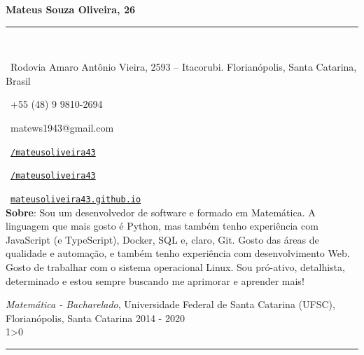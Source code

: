 \documentclass[a4paper,10pt]{article}
\makeatletter
\newcommand{\profissional}{Mateus Souza Oliveira}
\newcommand{\idade}{26}
\newcommand{\Endereco}{Rodovia Amaro Antônio Vieira, 2593 -- Itacorubi. Florianópolis, Santa Catarina, Brasil}
\newcommand{\telefone}{+55 (48) 9 9810-2694}
\newcommand{\email}{matews1943@gmail.com}
\newcommand{\sobre}{
    Sou um desenvolvedor de software e formado em Matemática. A linguagem que mais gosto é 
    Python, mas também tenho experiência com JavaScript (e TypeScript), Docker, SQL e, claro,
    Git. Gosto das áreas de qualidade e automação, e também tenho experiência com desenvolvimento 
    Web. Gosto de trabalhar com o sistema operacional Linux. Sou pró-ativo, detalhista, determinado 
    e estou sempre buscando me aprimorar e aprender mais!
    \vspace{2\baselineskip}
}
\newcommand{\criaSecao}[4][0]{
	\begin{tcolorbox}[
        blanker,
        breakable,
        title=\begin{minipage}{0.16\linewidth}\large{\textbf{#2}}\vspace{-#3\baselineskip}\end{minipage},
        coltitle=black,
        leftupper=0.21\linewidth,
    ]
        #4
		\ifnum0#1>0 { \hrule {\ } } \fi
    \end{tcolorbox}
}
\makeatother
\begin{document}
	\begin{minipage}{0.65\linewidth}
		\Huge{\bf \profissional, \idade}\\\vspace{-1.75\baselineskip}

		\noindent\rule{\textwidth}{1.5pt} {\ }\\\vspace{-1.8\baselineskip}

		\large{
		\faMapMarker \ \Endereco \\
		\begin{minipage}{0.5\linewidth}
			\faWhatsapp \ \telefone
		\end{minipage}
		\begin{minipage}{0.5\linewidth}
			\faEnvelope \ \email
		\end{minipage}
		\begin{minipage}{0.5\linewidth}
			\faLinkedinSquare \ \href{https://www.linkedin.com/in/mateusoliveira43/}{\texttt{/mateusoliveira43}}
		\end{minipage}
		\begin{minipage}{0.5\linewidth}
			\faGithub \ \href{https://github.com/mateusoliveira43}{\texttt{/mateusoliveira43}}
		\end{minipage}
		\faLink \ \href{https://mateusoliveira43.github.io/}{\texttt{mateusoliveira43.github.io}}\\
		\vfill
		\textbf{Sobre}:\sobre
		}
	\end{minipage}
	\vspace{\baselineskip}

    \criaSecao[1]{Educação}{2}{
		\textit{Matemática - Bacharelado}, Universidade Federal de Santa Catarina (UFSC), Florianópolis, Santa Catarina \hfill 2014 - 2020 \\
    }
\end{document}
